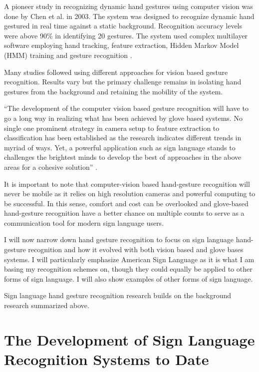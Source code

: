 A pioneer study in recognizing dynamic hand gestures using computer vision was done by Chen et al. \parencite{Chen2003} in 2003. The system was designed to recognize dynamic hand gestured in real time against a static background. Recognition accuracy levels were above 90\% in identifying 20 gestures. The system used complex multilayer software employing hand tracking, feature extraction, Hidden Markov Model (HMM) training and gesture recognition \parencite{Chen2003}. 

Many studies followed \parencite{GastaldiG.PareschiA.SabatiniS.SolariF.Bisio2005}  \parencite{Premaratne2007}  \parencite{Binh2005}  \parencite{Binh2006}  \parencite{Berci2007} using different approaches for vision based gesture recognition. Results vary but the primary challenge remains in isolating hand gestures from the background and retaining the mobility of the system. 


``The development of the computer vision based gesture recognition will have to go a long way in realizing what has been achieved by glove based systems. No single one prominent strategy in camera setup to feature extraction to classification has been established as the research indicates different trends in myriad of ways. Yet, a powerful application such as sign language stands to challenges the brightest minds to develop the best of approaches in the above areas for a cohesive solution'' \parencite{Premaratne2010}. 

It is important to note that computer-vision based hand-gesture recognition will never be mobile as it relies on high resolution cameras and powerful computing to be successful. In this sense, comfort and cost can be overlooked and glove-based hand-gesture recognition have a better chance on multiple counts to serve as a communication tool for modern sign language users. 

I will now narrow down hand gesture recognition to focus on sign language hand-gesture recognition and how it evolved with both vision based and glove bases systems. I will particularly emphasize American Sign Language as it is what I am basing my recognition schemes on, though they could equally be applied to other forms of sign language. I will also show examples of other forms of sign language. 

Sign language hand gesture recognition research builds on the background research summarized above. 


\section{The Development of Sign Language Recognition Systems to Date}

